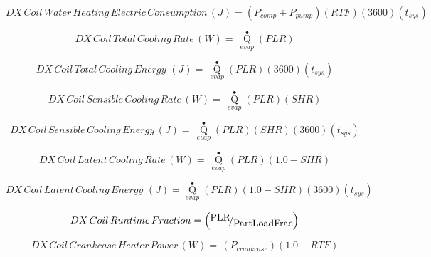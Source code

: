 \begin{equation}
DX\,Coil\,Water\,Heating\,Electric\,Consumption\,(J) = \left( {{P_{comp}} + {P_{pump}}} \right)\left( {RTF} \right)\left( {3600} \right)\left( {{t_{sys}}} \right)
\end{equation}

\begin{equation}
DX\,Coil\,Total\,Cooling\,Rate\,(W) = \,{\mathop Q\limits^ \bullet_{evap}}\left( {PLR} \right)
\end{equation}

\begin{equation}
DX\,Coil\,Total\,Cooling\,Energy\,\,(J) = \,{\mathop Q\limits^ \bullet_{evap}}\left( {PLR} \right)\left( {3600} \right)\left( {{t_{sys}}} \right)
\end{equation}

\begin{equation}
DX\,Coil\,Sensible\,Cooling\,Rate\,(W) = \,{\mathop Q\limits^ \bullet_{evap}}\left( {PLR} \right)\left( {SHR} \right)
\end{equation}

\begin{equation}
DX\,Coil\,Sensible\,Cooling\,Energy\,(J) = \,{\mathop Q\limits^ \bullet_{evap}}\left( {PLR} \right)\left( {SHR} \right)\left( {3600} \right)\left( {{t_{sys}}} \right)
\end{equation}

\begin{equation}
DX\,Coil\,Latent\,Cooling\,Rate\,(W) = \,{\mathop Q\limits^ \bullet_{evap}}\left( {PLR} \right)\left( {1.0 - SHR} \right)
\end{equation}

\begin{equation}
DX\,Coil\,Latent\,Cooling\,Energy\,\,(J) = {\mathop Q\limits^ \bullet_{evap}}\left( {PLR} \right)\left( {1.0 - SHR} \right)\left( {3600} \right)\left( {{t_{sys}}} \right)
\end{equation}

\begin{equation}
DX\,Coil\,Runtime\,Fraction = \left( {{\raise0.7ex\hbox{{PLR}} \!\mathord{\left/ {\vphantom {{PLR} {PartLoadFrac}}}\right.}\!\lower0.7ex\hbox{{PartLoadFrac}}}} \right)
\end{equation}

\begin{equation}
DX\,Coil\,Crankcase\,Heater\,Power\,(W) = \,\left( {{P_{crankcase}}} \right)\left( {1.0 - RTF} \right)
\end{equation}

